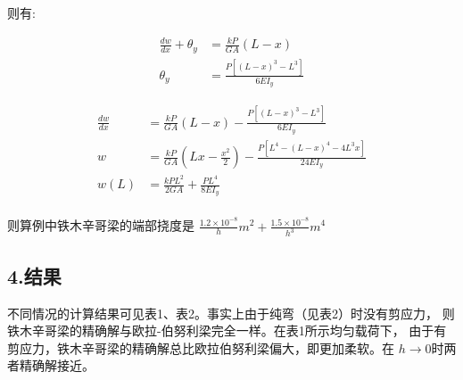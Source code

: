 \documentclass[UTF8,c5size]{ctexart}
\begin{document}
则有:

\begin{equation}
    \begin{split}
        \frac{dw}{dx}+\theta_y&=\frac{kP}{GA}\left(
        L-x
        \right)\\
        \theta_y&=\frac{P\left[(L-x)^3-L^3\right]}{6EI_y}
    \end{split}
\end{equation}

\begin{equation}
    \begin{split}
        \frac{dw}{dx}&=\frac{kP}{GA}\left(
            L-x
            \right)-
            \frac{P\left[(L-x)^3-L^3\right]}{6EI_y}\\
        w&=\frac{kP}{GA}\left(
            Lx-\frac{x^2}{2}
            \right)-
            \frac{P\left[L^4-(L-x)^4-4L^3x\right]}{24EI_y}\\
        w(L)&=\frac{kPL^2}{2GA}+
            \frac{PL^4}{8EI_y}\\
    \end{split}
\end{equation}

则算例中铁木辛哥梁的端部挠度是
$\frac{1.2\times10^{-8}}{h}m^2+\frac{1.5\times10^{-8}}{h^3}m^4$


\subsection*{4.结果}

不同情况的计算结果可见表1、表2。事实上由于纯弯（见表2）时没有剪应力，
则铁木辛哥梁的精确解与欧拉-伯努利梁完全一样。在表1所示均匀载荷下，
由于有剪应力，铁木辛哥梁的精确解总比欧拉伯努利梁偏大，即更加柔软。在
$h\rightarrow 0$时两者精确解接近。
\end{document}
